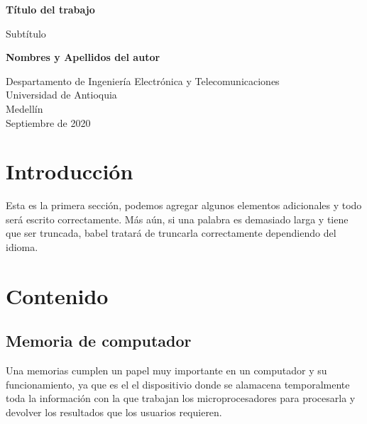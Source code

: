\documentclass{article}
\begin{document}
\begin{titlepage}
    \begin{center}
        \vspace*{1cm}
            
        \Huge
        \textbf{Título del trabajo}
            
        \vspace{0.5cm}
        \LARGE
        Subtítulo
            
        \vspace{1.5cm}
            
        \textbf{Nombres y Apellidos del autor}
            
        \vfill
            
        \vspace{0.8cm}
            
        \Large
        Despartamento de Ingeniería Electrónica y Telecomunicaciones\\
        Universidad de Antioquia\\
        Medellín\\
        Septiembre de 2020
            
    \end{center}
\end{titlepage}

\tableofcontents

\section{Introducción}
Esta es la primera sección, podemos agregar algunos elementos adicionales y todo será escrito correctamente. Más aún, si una palabra es demasiado larga y tiene que ser truncada, babel tratará de truncarla correctamente dependiendo del idioma.

\section{Contenido} \label{contenido}

\subsection{Memoria de computador}

Una memorias cumplen un papel muy importante en un computador y su funcionamiento, ya que es el el dispositivio donde se alamacena temporalmente toda la información con la que trabajan los microprocesadores para procesarla y devolver los resultados que los usuarios requieren. \cite{taller} \\
\end{document}

